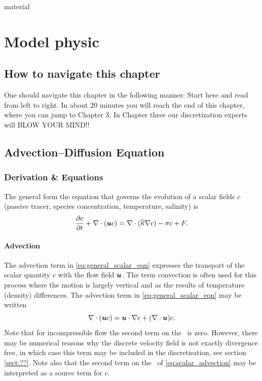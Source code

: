 material\chapter{Model physic}\label{chap:model_physics}

\section{How to navigate this chapter}
One should navigate this chapter in the following manner: Start here and read from left to right. In about 20 minutes you will reach the end of this chapter, where you can jump to Chapter 3. In Chapter three our discretization experts will BLOW YOUR MIND!!

\section{Advection--Diffusion Equation}\label{Sect:MP-AdvdifEqn}

\subsection{Derivation \& Equations}

The general form the equation that governs the evolution of a scalar fields $c$
(\eg passive tracer, species concentration, temperature, salinity) is
\begin{equation}\label{eq:general_scalar_eqn}
\frac{\partial c}{\partial t} + \nabla\cdot({\mbox{\boldmath$u$}} c) = \nabla\cdot(\overline{\overline{\kappa}}\nabla c) - \sigma c + F.
\end{equation}

\subsubsection{Advection}
The advection term in \eqref{eq:general_scalar_eqn} expresses the transport of 
the scalar quantity $c$ with the flow field ${\mbox{\boldmath$u$}}$. The term convection is often
used for this process where the motion is largely vertical and as the results of
temperature (density) differences.
The advection term in \eqref{eq:general_scalar_eqn} may be written
\begin{equation}\label{eq:scalar_advection}
\nabla\cdot({\mbox{\boldmath$u$}} c) = {\mbox{\boldmath$u$}}\cdot\nabla c + (\nabla\cdot{\mbox{\boldmath$u$}})c.
\end{equation}
Note that for incompressible flow the second term on the \rhs\ is zero. However, there may be numerical
reasons why the discrete velocity field is not exactly divergence free, in which case this term may
be included in the discretisation, see section \ref{sect:??}. Note also that the second term on
the \rhs\ of \eqref{eq:scalar_advection} may be interpreted as a source term for $c$.

